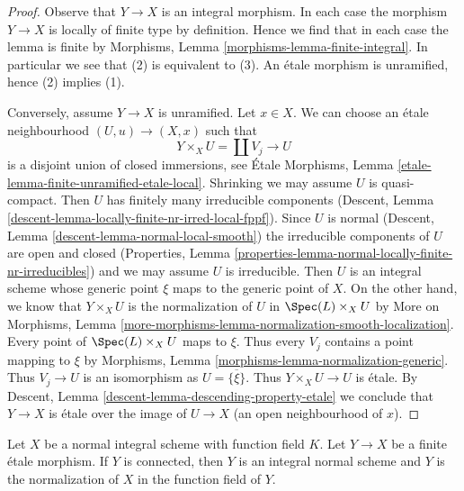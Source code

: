 \begin{proof}
Observe that $Y \to X$ is an integral morphism.
In each case the morphism $Y \to X$ is locally of finite type
by definition.
Hence we find that in each case the lemma is finite by
Morphisms, Lemma \ref{morphisms-lemma-finite-integral}.
In particular we see that (2) is equivalent to (3).
An \'etale morphism is unramified, hence (2) implies (1).

\medskip\noindent
Conversely, assume $Y \to X$ is unramified. Let $x \in X$.
We can choose an \'etale neighbourhood $(U, u) \to (X, x)$ such that
$$
Y \times_X U = \coprod V_j \longrightarrow U
$$
is a disjoint union of closed immersions, see
\'Etale Morphisms, Lemma \ref{etale-lemma-finite-unramified-etale-local}.
Shrinking we may assume $U$ is quasi-compact.
Then $U$ has finitely many irreducible components
(Descent, Lemma \ref{descent-lemma-locally-finite-nr-irred-local-fppf}).
Since $U$ is normal
(Descent, Lemma \ref{descent-lemma-normal-local-smooth}) the
irreducible components of $U$ are open and closed
(Properties, Lemma \ref{properties-lemma-normal-locally-finite-nr-irreducibles})
and we may assume $U$ is irreducible. Then $U$ is an integral
scheme whose generic point $\xi$ maps to the generic point of $X$.
On the other hand, we know that $Y \times_X U$
is the normalization of $U$ in $\Spec(L) \times_X U$
by More on Morphisms, Lemma
\ref{more-morphisms-lemma-normalization-smooth-localization}.
Every point of $\Spec(L) \times_X U$ maps to $\xi$.
Thus every $V_j$ contains a point mapping to $\xi$ by
Morphisms, Lemma \ref{morphisms-lemma-normalization-generic}.
Thus $V_j \to U$ is an isomorphism as $U = \overline{\{\xi\}}$.
Thus $Y \times_X U \to U$ is \'etale. By
Descent, Lemma \ref{descent-lemma-descending-property-etale}
we conclude that $Y \to X$ is \'etale over the
image of $U \to X$ (an open neighbourhood of $x$).
\end{proof}

\begin{lemma}
\label{lemma-finite-etale-covering-normal-unramified}
Let $X$ be a normal integral scheme with function field $K$.
Let $Y \to X$ be a finite \'etale morphism. If $Y$ is connected,
then $Y$ is an integral normal scheme and $Y$ is the normalization
of $X$ in the function field of $Y$.
\end{lemma}

